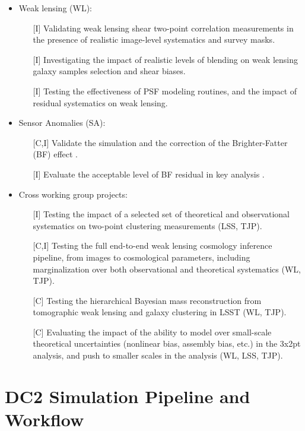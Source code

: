 \documentclass[preprint,times]{aastex61}
\begin{document}
\begin{itemize}
\begin{enumerate}
\end{enumerate}
\item Weak lensing (WL):
\begin{enumerate}
\item[{[I]}] Validating weak lensing shear two-point correlation measurements in the presence of realistic image-level systematics and survey masks.
\item[{[I]}] Investigating the impact of realistic levels of blending on weak lensing galaxy samples selection and shear biases.
\item[{[I]}] Testing the effectiveness of PSF modeling routines, and the impact of residual systematics on weak lensing.
\end{enumerate}
\item Sensor Anomalies (SA):
\begin{enumerate}
\item[{[C,I]}] Validate the simulation and the  correction of the Brighter-Fatter (BF)  effect .
\item[{[I]}]  Evaluate the acceptable level of  BF residual in key analysis . 
\end{enumerate}
\item Cross working group projects:
\begin{enumerate}
\item[{[I]}] Testing the impact of a selected set of theoretical and observational systematics on
  two-point clustering measurements (LSS, TJP).
\item[{[C,I]}] Testing the full end-to-end weak lensing cosmology inference pipeline, from images to
  cosmological parameters, including marginalization over both observational and theoretical
  systematics (WL, TJP).
\item[{[C]}] Testing the hierarchical Bayesian mass reconstruction from tomographic weak lensing and
  galaxy clustering in LSST (WL, TJP).
\item[{[C]}] Evaluating the impact of the ability to model over small-scale theoretical
  uncertainties (nonlinear bias, assembly bias, etc.) in the 3x2pt analysis, and push to smaller
  scales in the analysis (WL, LSS, TJP).
\end{enumerate}
\end{itemize}

\section{DC2 Simulation Pipeline and Workflow}
\end{document}

